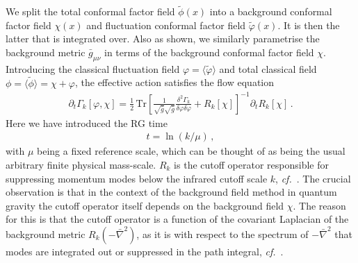 \documentclass[11pt]{book} %
\newcommand\cf{\textit{cf.}\ }
\newcommand{\vp}{\varphi}
\numberwithin{equation}{chapter}
\begin{document}
We split the total conformal factor field $\tilde\phi(x)$ into a background conformal factor
field $\chi(x)$ and fluctuation conformal factor field $\tilde\vp(x)$.
It is then the latter that is integrated over. Also as shown, we similarly parametrise the background
metric $\bar{g}_{\mu\nu}$ in terms of the background conformal factor field $\chi$.
Introducing the classical fluctuation field $\vp = \langle \tilde \vp \rangle$ and total classical
field $\phi = \langle \tilde \phi \rangle = \chi + \vp$, the effective action  satisfies the flow equation
\begin{align}
  \partial_t \Gamma_k[\vp,\chi] =
  \frac{1}{2} \, \mathrm{Tr} \left[\frac{1}{\sqrt{\bar g}\sqrt{\bar g}}
    \frac{\delta^2\Gamma_k}
         {\delta \vp \delta \vp}+ R_k[\chi]\right]^{-1} \partial_t R_k[\chi]\,.
  \label{equ:flowGamma}
\end{align}
Here we have introduced the RG time
\begin{align}
  t = \ln(k/\mu) \,,
  \label{time}
\end{align}
with $\mu$ being a fixed reference scale, which can be thought of as being the usual arbitrary
finite physical mass-scale.
$R_k$ is the cutoff operator responsible for suppressing momentum modes below the
infrared cutoff scale $k$, \cf \cite{Wetterich:1992yh, Morris:1993qb}.
The crucial observation is that in the context of the background field method in quantum gravity the
cutoff operator itself depends on the background field $\chi$.
The reason for this is that the cutoff operator is a function of the covariant Laplacian of the
background metric $R_k\left(-\bar \nabla^2\right)$, as it is with respect to the spectrum of
$-\bar\nabla^2$ that modes are integrated out or suppressed in the path integral,
\cf \cite{Reuter:2008wj,Reuter:2009kq}.
\end{document}
